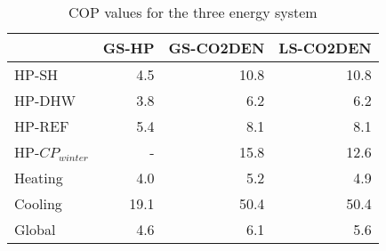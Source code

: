 \begin{table}[htp]
\centering
\caption{COP values for the three energy system}\vspace{2mm}
\label{tab:V_cops} 
\begin{tabular}{lrrr}
	\toprule
	& GS-HP & GS-CO2DEN & LS-CO2DEN \\ \midrule
	HP-SH            & 4.5  & 10.8    & 10.8    \\
	HP-DHW           & 3.8  & 6.2     & 6.2     \\
	HP-REF           & 5.4  & 8.1     & 8.1     \\
	HP-$CP_{winter}$ & -    & 15.8    & 12.6    \\
	Heating          & 4.0  & 5.2     & 4.9     \\
	Cooling          & 19.1 & 50.4      & 50.4      \\
	Global           & 4.6  & 6.1     & 5.6    \\ \bottomrule
\end{tabular}
\end{table}
